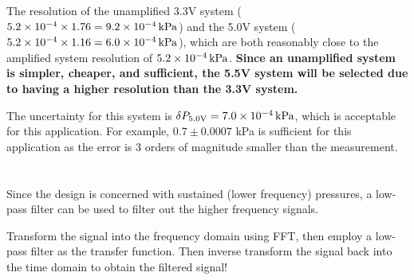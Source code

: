 The resolution of the unamplified 3.3V system ($5.2\times 10^{-4} \times 1.76 = \qty{9.2E-4}{\kilo\pascal}$) and the 5.0V system 
($5.2\times 10^{-4} \times 1.16 = \qty{6.0E-4}{\kilo\pascal}$), which are both reasonably close to the amplified system resolution of 
$\qty{5.2E-4}{\kilo\pascal}$. \textbf{Since an unamplified system is simpler, cheaper, and sufficient, the 5.5V system will be selected 
due to having a higher resolution than the 3.3V system.}

The uncertainty for this system is $\delta P_{5.0\text{V}} = \qty{7.0E-4}{\kilo\pascal}$, which is acceptable for this application.
For example, $0.7 \pm 0.0007$ kPa is sufficient for this application as the error is 3 orders of magnitude smaller than the measurement.

\section{}
Since the design is concerned with sustained (lower frequency) pressures, a low-pass filter can be used to filter out the higher frequency
signals. 

Transform the signal into the frequency domain using FFT, then employ a low-pass filter as the transfer function. Then 
inverse transform the signal back into the time domain to obtain the filtered signal!

